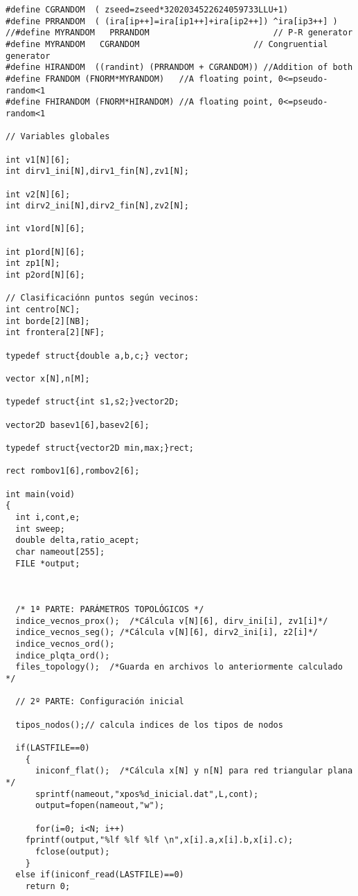 \begin{verbatim}
#define CGRANDOM  ( zseed=zseed*3202034522624059733LLU+1)
#define PRRANDOM  ( (ira[ip++]=ira[ip1++]+ira[ip2++]) ^ira[ip3++] )
//#define MYRANDOM   PRRANDOM                         // P-R generator
#define MYRANDOM   CGRANDOM                       // Congruential generator
#define HIRANDOM  ((randint) (PRRANDOM + CGRANDOM)) //Addition of both
#define FRANDOM (FNORM*MYRANDOM)   //A floating point, 0<=pseudo-random<1
#define FHIRANDOM (FNORM*HIRANDOM) //A floating point, 0<=pseudo-random<1

// Variables globales

int v1[N][6];
int dirv1_ini[N],dirv1_fin[N],zv1[N];

int v2[N][6];
int dirv2_ini[N],dirv2_fin[N],zv2[N];

int v1ord[N][6];

int p1ord[N][6];
int zp1[N];
int p2ord[N][6];

// Clasificaciónn puntos según vecinos:
int centro[NC];
int borde[2][NB];
int frontera[2][NF];

typedef struct{double a,b,c;} vector;

vector x[N],n[M];

typedef struct{int s1,s2;}vector2D; 

vector2D basev1[6],basev2[6];

typedef struct{vector2D min,max;}rect;

rect rombov1[6],rombov2[6];

int main(void)
{
  int i,cont,e;
  int sweep;
  double delta,ratio_acept;
  char nameout[255];
  FILE *output;
  
  
  
  /* 1ª PARTE: PARÁMETROS TOPOLÓGICOS */
  indice_vecnos_prox();  /*Cálcula v[N][6], dirv_ini[i], zv1[i]*/
  indice_vecnos_seg(); /*Cálcula v[N][6], dirv2_ini[i], z2[i]*/
  indice_vecnos_ord();
  indice_plqta_ord();
  files_topology();  /*Guarda en archivos lo anteriormente calculado */

  // 2º PARTE: Configuración inicial

  tipos_nodos();// calcula indices de los tipos de nodos

  if(LASTFILE==0)
    {
      iniconf_flat();  /*Cálcula x[N] y n[N] para red triangular plana */
      sprintf(nameout,"xpos%d_inicial.dat",L,cont);
      output=fopen(nameout,"w");
  
      for(i=0; i<N; i++)
	fprintf(output,"%lf %lf %lf \n",x[i].a,x[i].b,x[i].c);
      fclose(output);
    }
  else if(iniconf_read(LASTFILE)==0)
    return 0;


\end{verbatim}
